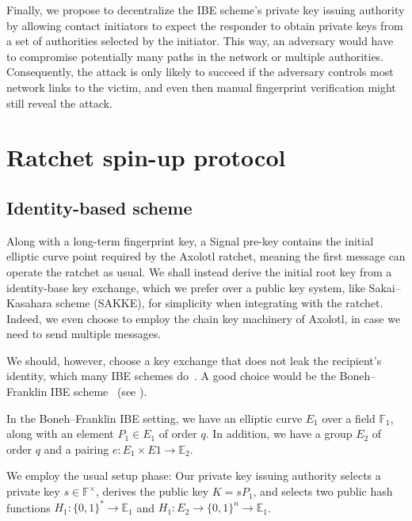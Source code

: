 \documentclass[twoside,letterpaper]{sig-alternate}
\begin{document}
Finally, we propose to decentralize the IBE scheme's private key
issuing authority by allowing contact initiators to expect the
responder to obtain private keys from a set of authorities selected by
the initiator.  This way, an adversary would have to compromise
potentially many paths in the network or multiple authorities.
Consequently, the attack is only likely to succeed if the adversary
controls most network links to the victim, and even then manual
fingerprint verification might still reveal the attack.


\section{Ratchet spin-up protocol}

\def\E{\mathbb{E}}
\def\F{\mathbb{F}}
\def\Z{\mathbb{Z}}
\def\ID{\mathtt{ID}}
\def\rk{\mathtt{rk}}
\def\ck{\mathtt{ck}}
\def\mk{\mathtt{mk}}

\subsection{Identity-based scheme}

Along with a long-term fingerprint key,
a Signal pre-key contains the initial elliptic curve point required
by the Axolotl ratchet, meaning
 the first message can operate the ratchet as usual.
We shall instead derive the initial root key from a identity-base key
exchange, which we prefer over a public key system,
 like Sakai–Kasahara scheme (SAKKE),
for simplicity when integrating with the ratchet.
Indeed, we even choose to employ the chain key machinery of Axolotl,
 in case we need to send multiple messages.

We should, however, choose a key exchange that does not leak the recipient's
identity, which many IBE schemes do~\cite{AnonIBE}.
A good choice would be the Boneh–Franklin IBE scheme~\cite{BF-IBE}
(see \cite[??]{BoyenMIBS}).

In the Boneh–Franklin IBE setting,
we have an elliptic curve $E_1$ over a field $\F_1$,
 along with an element $P_1 \in E_1$ of order $q$.
In addition, we have a group $E_2$ of order $q$ and
 a pairing $e: E_1 \times E1 \to \mathbb{E}_2$.

We employ the usual setup phase:
Our private key issuing authority
 selects a private key $s \in \F^\times$,
 derives the public key $K = s P_1$, and
 selects two public hash functions
  $H_1 : \{0,1\}^* \to \E_1$ and $H_1 : E_2 \to \{0,1\}^n \to \E_1$.
\end{document}

